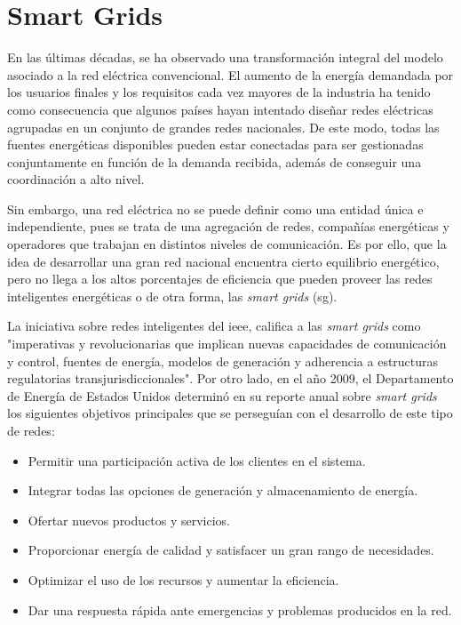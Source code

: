 \section{Smart Grids}
\label{sec:smartgrids}


En las últimas décadas, se ha observado una transformación integral del modelo asociado a la red eléctrica convencional. El aumento de la energía demandada por los usuarios finales y los requisitos cada vez mayores de la industria ha tenido como consecuencia que algunos países hayan intentado diseñar redes eléctricas agrupadas en un conjunto de grandes redes nacionales. De este modo, todas las fuentes energéticas disponibles pueden estar conectadas para ser gestionadas conjuntamente en función de la demanda recibida, además de conseguir una coordinación a alto nivel. \cite{smartgrid_overview}

\vspace{3mm}

Sin embargo, una red eléctrica no se puede definir como una entidad única e independiente, pues se trata de una agregación de redes, compañías energéticas y operadores que trabajan en distintos niveles de comunicación. Es por ello, que la idea de desarrollar una gran red nacional encuentra cierto equilibrio energético, pero no llega a los altos porcentajes de eficiencia que pueden proveer las redes inteligentes energéticas o de otra forma, las \textit{smart grids} (\gls{sg}). 

\vspace{3mm}

La iniciativa sobre redes inteligentes del \gls{ieee}, califica a las \textit{smart grids} \cite{ieee} como "imperativas y revolucionarias que implican nuevas capacidades de comunicación y control, fuentes de energía, modelos de generación y adherencia a estructuras regulatorias transjurisdiccionales". Por otro lado, en el año 2009, el Departamento de Energía de Estados Unidos \cite{us} determinó en su reporte anual sobre \textit{smart grids} los siguientes objetivos principales que se perseguían con el desarrollo de este tipo de redes: 

\begin{itemize}
  \item Permitir una participación activa de los clientes en el sistema.
  \item Integrar todas las opciones de generación y almacenamiento de energía.
  \item Ofertar nuevos productos y servicios.
  \item Proporcionar energía de calidad y satisfacer un gran rango de necesidades.
  \item Optimizar el uso de los recursos y aumentar la eficiencia.
  \item Dar una respuesta rápida ante emergencias y problemas producidos en la red.
\end{itemize}

